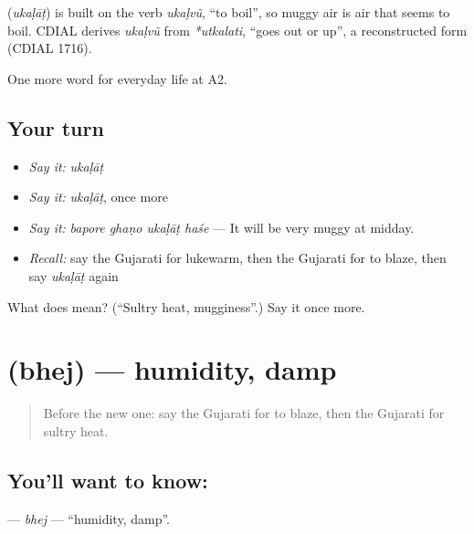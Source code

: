 \begin{cousinweb}
\textbf{} (\emph{ukaḷāṭ}) is built on the verb \emph{ukaḷvũ}, \textquotedblleft{}to boil\textquotedblright{}, so muggy air is air that seems to boil. CDIAL derives \emph{ukaḷvũ} from \emph{*utkalati}, \textquotedblleft{}goes out or up\textquotedblright{}, a reconstructed form (CDIAL 1716).
\end{cousinweb}

\begin{grammarlens}[title={What you've built}]
One more word for everyday life at A2.
\end{grammarlens}

\subsection*{Your turn}
\begin{itemize}
\raggedright
  \item \emph{Say it:} \emph{ukaḷāṭ}
  \item \emph{Say it:} \emph{ukaḷāṭ}, once more
  \item \emph{Say it:} \emph{bapore ghaṇo ukaḷāṭ haśe} — It will be very muggy at midday.
  \item \emph{Recall:} say the Gujarati for lukewarm, then the Gujarati for to blaze, then say \emph{ukaḷāṭ} again
\end{itemize}

\begin{tcolorbox}[breakable,colback=teal!4,colframe=teal!35!black,title={Before you move on}]
What does  mean? (\textquotedblleft{}Sultry heat, mugginess\textquotedblright{}.) Say it once more.
\end{tcolorbox}
\section[\texorpdfstring{\gu{ભેજ} (bhej)}{ભેજ (bhej)}]{ (bhej) — humidity, damp}

\label{lesson:GU-C216-bhej}



\begin{quote}
Before the new one: say the Gujarati for to blaze, then the Gujarati for sultry heat.
\end{quote}

\subsection*{You'll want to know: }
\textbf{} — \emph{bhej} — \textquotedblleft{}humidity, damp\textquotedblright{}.

